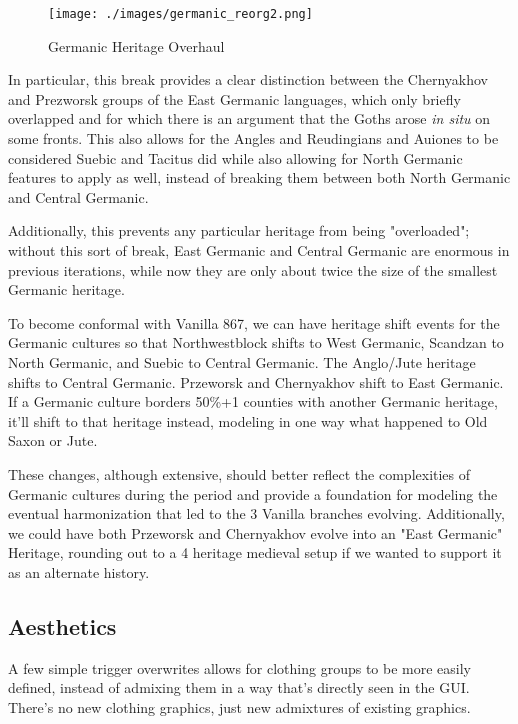 \documentclass{article}
\begin{document}
	\begin{figure}[h!]
		\centering
		\texttt{[image: ./images/germanic\_reorg2.png]}
		\caption{Germanic Heritage Overhaul}
	\end{figure}
	
	In particular, this break provides a clear distinction between the Chernyakhov and Prezworsk groups of the East Germanic languages, which only briefly overlapped and for which there is an argument that the Goths arose \textit{in situ} on some fronts.
	This also allows for the Angles and Reudingians and Auiones to be considered Suebic and Tacitus did while also allowing for North Germanic features to apply as well, instead of breaking them between both North Germanic and Central Germanic.
	
	Additionally, this prevents any particular heritage from being "overloaded"; without this sort of break, East Germanic and Central Germanic are enormous in previous iterations, while now they are only about twice the size of the smallest Germanic heritage.
	
	To become conformal with Vanilla 867, we can have heritage shift events for the Germanic cultures so that Northwestblock shifts to West Germanic, Scandzan to North Germanic, and Suebic to Central Germanic.
	The Anglo/Jute heritage shifts to Central Germanic.
	Przeworsk and Chernyakhov shift to East Germanic.
	If a Germanic culture borders 50\%+1 counties with another Germanic heritage, it'll shift to that heritage instead, modeling in one way what happened to Old Saxon or Jute.
	
	These changes, although extensive, should better reflect the complexities of Germanic cultures during the period and provide a foundation for modeling the eventual harmonization that led to the 3 Vanilla branches evolving.
	Additionally, we could have both Przeworsk and Chernyakhov evolve into an "East Germanic" Heritage, rounding out to a 4 heritage medieval setup if we wanted to support it as an alternate history. 
	
	\subsection{Aesthetics}
	\label{sec:culture_review:subsec:aesthetics}
	A few simple trigger overwrites allows for clothing groups to be more easily defined, instead of admixing them in a way that’s directly seen in the GUI. There’s no new clothing graphics, just new admixtures of existing graphics.
	
\end{document}
